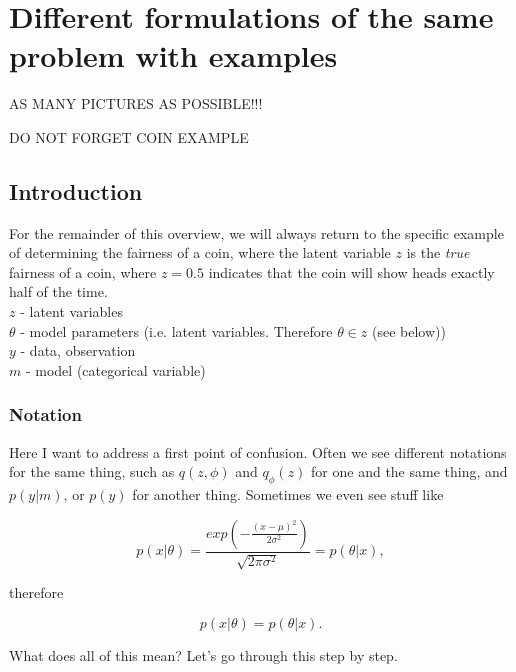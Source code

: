 \chapter{Different formulations of the same problem with examples}
\label{sec:ELBO}

AS MANY PICTURES AS POSSIBLE!!!

DO NOT FORGET COIN EXAMPLE

\section{Introduction}
\noindent For the remainder of this overview, we will always return to the specific example of determining the fairness of a coin, where the latent variable $z$ is the \textit{true} fairness of a coin, where $z=0.5$ indicates that the coin will show heads exactly half of the time. \\

\noindent $z$ - latent variables \\
\noindent $\theta$ - model parameters (i.e. latent variables. Therefore $\theta \in z$ (see below)) \\
\noindent $y$ - data, observation \\
\noindent $m$ - model (categorical variable) \\

\subsection{Notation}

\noindent Here I want to address a first point of confusion. Often we see different notations for the same thing, such as $q(z,\phi)$ and $q_{\phi}(z)$ for one and the same thing, and $p(y|m)$, or $p(y)$ for another thing. Sometimes we even see stuff like

\begin{equation}
p(x|\theta) = \frac{exp(-\frac{(x-\mu)^2}{2\sigma^2})}{\sqrt{2\pi \sigma^2}} = p(\theta|x),
\end{equation}

therefore

\begin{equation}
p(x|\theta) = p(\theta|x).
\end{equation}

\noindent What does all of this mean? Let's go through this step by step.

